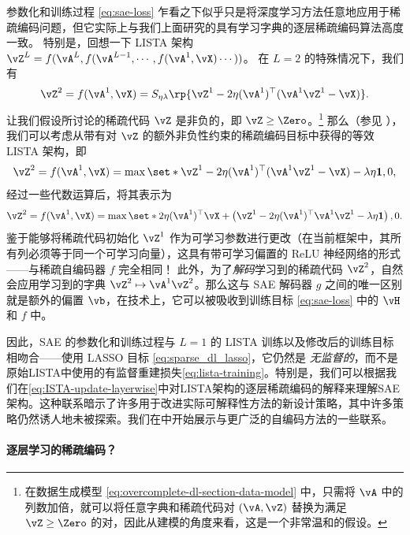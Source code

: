 \documentclass[../../book-main_zh.tex]{subfiles}
\begin{document}
参数化和训练过程 \eqref{eq:sae-loss}
乍看之下似乎只是将深度学习方法任意地应用于稀疏编码问题，但它实际上与我们上面研究的具有学习字典的逐层稀疏编码算法高度一致。
特别是，回想一下 LISTA %
架构 $\vZ^{L} = f(\vA^L, f(\vA^{L-1}, \cdots, f(\vA^1, \vX) \cdots ))$。
在 $L=2$ 的特殊情况下，我们有
\begin{equation}
    \vZ^2 = f(\vA^1, \vX)
    =S_{\eta\lambda}\rp{\vZ^{1} - 2\eta(\vA^{1})^{\top}(\vA^1\vZ^{1} - \vX)}.
\end{equation}
让我们假设所讨论的稀疏代码 $\vZ$ 是非负的，即 $\vZ \geq \Zero$。\footnote{在数据生成模型
    \eqref{eq:overcomplete-dl-section-data-model} 中，只需将 $\vA$
    中的列数加倍，就可以将任意字典和稀疏代码对 $(\vA, \vZ)$ 替换为满足 $\vZ \geq \Zero$
的对，因此从建模的角度来看，这是一个非常温和的假设。}
那么（参见 ），我们可以考虑从带有对 $\vZ$
的额外非负性约束的稀疏编码目标中获得的等效 LISTA 架构，即
\begin{equation}
    \vZ^2 = f(\vA^1, \vX)
    =\max \set*{\vZ^{1} - 2\eta(\vA^{1})^{\top}(\vA^1\vZ^{1} - \vX)
    - \lambda\eta \mathbf{1}, 0},
\end{equation}
经过一些代数运算后，将其表示为
\begin{equation}
    \vZ^2 = f(\vA^1, \vX)
    =\max \set*{
        2\eta(\vA^{1})^{\top}\vX
        +
        \left(
            \vZ^{1} - 2\eta(\vA^{1})^{\top}\vA^1\vZ^{1} - \lambda\eta \mathbf{1}
        \right), 0
    }.
\end{equation}
鉴于能够将稀疏代码初始化 $\vZ^1$ 作为可学习参数进行更改（在当前框架中，其所有列必须等于同一个可学习向量），这具有带可学习偏置的
ReLU 神经网络的形式——与稀疏自编码器 $f$ 完全相同！
此外，为了\textit{解码}学习到的稀疏代码 $\vZ^2$，自然会应用学习到的字典 $\vZ^2 \mapsto \vA^1
\vZ^2$。那么这与 SAE 解码器 $g$ 之间的唯一区别就是额外的偏置 $\vb$，在技术上，它可以被吸收到训练目标
\eqref{eq:sae-loss} 中的 $\vH$ 和 $f$ 中。

因此，SAE 的参数化和训练过程与 $L=1$ 的 LISTA 训练以及修改后的训练目标相吻合——使用 LASSO 目标
\eqref{eq:sparse_dl_lasso}，它仍然是 {\em
无监督的}，而不是原始LISTA中使用的有监督重建损失\eqref{eq:lista-training}。特别是，我们可以根据我们在\eqref{eq:ISTA-update-layerwise}中对LISTA架构的逐层稀疏编码的解释来理解SAE架构。这种联系暗示了许多用于改进实际可解释性方法的新设计策略，其中许多策略仍然诱人地未被探索。我们在中开始展示与更广泛的自编码方法的一些联系。

\paragraph{逐层学习的稀疏编码？}
\end{document}
